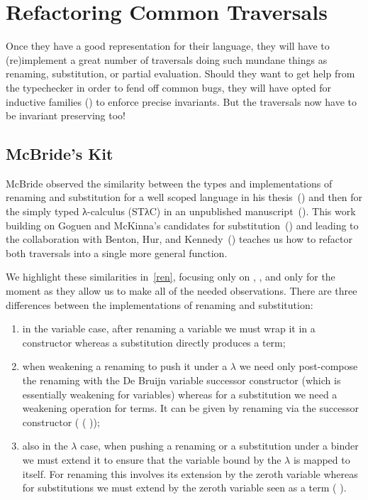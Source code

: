 \chapter{Refactoring Common Traversals}

Once they have a good representation for their language, they will have to
(re)implement a great number of traversals doing such mundane things as
renaming, substitution, or partial evaluation. Should they want to get help
from the typechecker in order to fend off common bugs, they will have opted
for inductive families (\cite{dybjer1991inductive}) to enforce precise
invariants. But the traversals now have to be invariant preserving too!

\section{McBride's Kit}

McBride observed the similarity between the types and implementations of renaming
and substitution for a well scoped language in his thesis~(\citeyear{mcbride1999})
and then for the simply typed λ-calculus (STλC) in an unpublished
manuscript~(\citeyear{mcbride2005type}). This work building on Goguen and McKinna's
candidates for substitution~(\citeyear{goguen1997candidates}) and leading to the
collaboration with Benton, Hur, and Kennedy~(\citeyear{benton2012strongly}) teaches
us how to refactor both traversals into a single more general function.

We highlight these similarities in~\cref{ren}, focusing only on ,
, and  only for the moment as they allow us to make all
of the needed observations. There are three differences between the implementations
of renaming and substitution:

\begin{enumerate}
  \item
    in the variable case, after renaming a variable we must wrap it
    in a  constructor whereas a substitution directly
    produces a term;
  \item
    when weakening a renaming to push it under a $λ$ we need only
    post-compose the renaming with the De Bruijn variable successor
    constructor  (which is essentially weakening for variables)
    whereas for a substitution we need a weakening operation for terms.
    It can be given by renaming via the successor constructor
    ( ( ));
  \item
    also in the $λ$ case, when pushing a renaming or a substitution under
    a binder we must extend it to ensure that the variable bound by the
    $λ$ is mapped to itself. For renaming this involves its extension by
    the zeroth variable  whereas for substitutions we must extend by
    the zeroth variable seen as a term ( ).
\end{enumerate}

